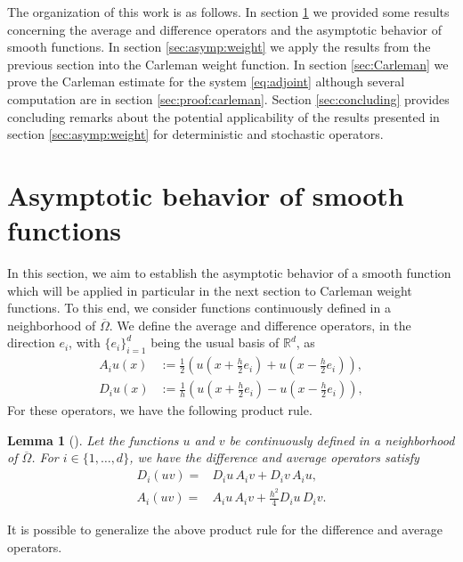 \documentclass[11pt,oneside,leqno]{amsart}
\numberwithin{equation}{section}
\numberwithin{equation}{section}
\newtheorem{lemma}[theorem]{Lemma}
\begin{document}
 
\par The organization of this work is as follows. In section \ref{preliminary} we provided some results concerning the average and difference operators and the asymptotic behavior of smooth functions. In section \ref{sec:asymp:weight} we apply the results from the previous section into the Carleman weight function. In section \ref{sec:Carleman} we prove the Carleman estimate for the system \ref{eq:adjoint} although several computation are in section \ref{sec:proof:carleman}. Section \ref{sec:concluding} provides concluding remarks about the potential applicability of the results presented in section \ref{sec:asymp:weight} for deterministic and stochastic operators.
\section{Asymptotic behavior of smooth functions}\label{preliminary}
In this section, we aim to establish the asymptotic behavior of a smooth function which will be applied in particular in the next section to Carleman weight functions. To this end, we consider functions continuously defined in a neighborhood of $\overline{\Omega}$. We define the average and difference operators, in the direction $e_{i}$, with $\{e_{i}\}_{i=1}^{d}$ being
the usual basis of $\mathbb{R}^{d}$, as 
\begin{equation}
\begin{split}
    A_{i}u(x)&:=\frac{1}{2}\left( u(x+\frac{h}{2}e_{i})+u(x-\frac{h}{2}e_{i})\right),\\
    D_{i}u(x)&:=\frac{1}{h}\left(u(x+\frac{h}{2}e_{i})-u(x-\frac{h}{2}e_{i}) \right),
    \end{split}
\end{equation}
  For these operators, we have the following product rule.
\begin{lemma}[{\cite[Lemma 2.1 and 2.2]{BHLR:2010}}] \label{base:case}
    Let the functions $u$ and $v$ be continuously defined in a neighborhood of $\overline{\Omega}$. For $i\in\{1,\ldots,d\}$, we have the difference and average operators satisfy
    \begin{align}
        D_{i}(uv)=&D_{i}u\,A_{i}v+D_{i}v\,A_{i}u,\label{D:product}\\
        A_{i}(uv)=&A_{i}u\,A_{i}v+\frac{h^{2}}{4}D_{i}u\,D_{i}v.\label{A:product}
    \end{align}
\end{lemma}
It is possible to generalize the above product rule for the difference and average operators.
\end{document}
